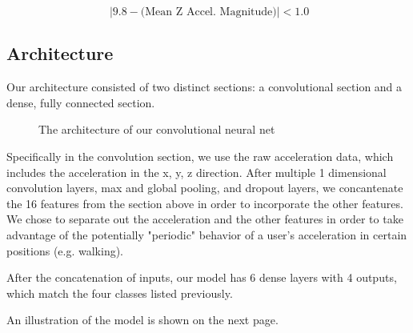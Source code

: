 \begin{equation}\label{eq1}
\ |9.8 - \text{(Mean Z Accel. Magnitude)}| < 1.0
\end{equation}



\subsection{Architecture}
Our architecture consisted of two distinct sections: a convolutional section and a dense, fully connected section. 


\begin{figure*}[!h]
  \vspace{-0.2cm}
  \centering
   {}
  \caption{The architecture of our convolutional neural net}
  \label{fig1}
  \vspace{-0.1cm}
\end{figure*}

Specifically in the convolution section, we use the raw acceleration data, which includes the acceleration in the x, y, z direction. 
After multiple 1 dimensional convolution layers, max and global pooling, and dropout layers, we concantenate the 16 features from the section above in order to incorporate the other features. 
We chose to separate out the acceleration and the other features in order to take advantage of the potentially "periodic" behavior of a user's acceleration in certain positions (e.g. walking).

After the concatenation of inputs, our model has 6 dense layers with 4 outputs, which match the four classes listed previously. 

An illustration of the model is shown on the next page.
